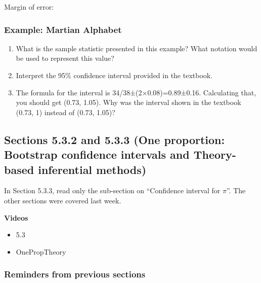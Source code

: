 \documentclass[
]{report}
\providecommand{\tightlist}{%
  \setlength{\itemsep}{0pt}\setlength{\parskip}{0pt}}
\newcommand{\rgs}{\vspace{12pt}} %
\begin{document}
Margin of error:
\rgs

\hypertarget{example-martian-alphabet-1}{%
\subsubsection*{Example: Martian Alphabet}\label{example-martian-alphabet-1}}

\begin{enumerate}
\def\labelenumi{\arabic{enumi}.}
\item
  What is the sample statistic presented in this example? What notation would be used to represent this value?
  \rgs
\item
  Interpret the 95\% confidence interval provided in the textbook.
  \rgs
\item
  The formula for the interval is 34/38±(2×0.08)=0.89±0.16. Calculating that, you should get (0.73, 1.05). Why was the interval shown in the textbook (0.73, 1) instead of (0.73, 1.05)?
  \rgs
\end{enumerate}

\hypertarget{sections-5.3.2-and-5.3.3-one-proportion-bootstrap-confidence-intervals-and-theory-based-inferential-methods}{%
\subsection*{Sections 5.3.2 and 5.3.3 (One proportion: Bootstrap confidence intervals and Theory-based inferential methods)}\label{sections-5.3.2-and-5.3.3-one-proportion-bootstrap-confidence-intervals-and-theory-based-inferential-methods}}


In Section 5.3.3, read only the sub-section on ``Confidence interval for \(\pi\)''. The other sections were covered last week.

\newpage

\textbf{Videos}

\begin{itemize}
\tightlist
\item
  5.3
\item
  OnePropTheory
\end{itemize}


\hypertarget{reminders-from-previous-sections-1}{%
\subsubsection*{Reminders from previous sections}\label{reminders-from-previous-sections-1}}
\end{document}
